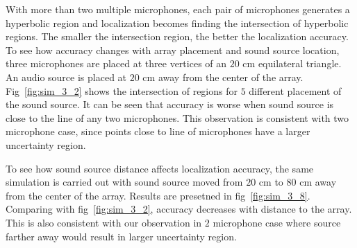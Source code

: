 With more than two multiple microphones, each pair of microphones generates a hyperbolic region and localization becomes finding the intersection of hyperbolic regions. The smaller the intersection region, the better the localization accuracy. To see how accuracy changes with array placement and sound source location, three microphones are placed at three vertices of an $20$ cm equilateral triangle. An audio source is placed at $20$ cm away from the center of the array. Fig~\ref{fig:sim_3_2} shows the intersection of regions for $5$ different placement of the sound source. It can be seen that accuracy is worse when sound source is close to the line of any two microphones. This observation is consistent with two microphone case, since points close to line of microphones have a larger uncertainty region.

To see how sound source distance affects localization accuracy, the same simulation is carried out with sound source moved from $20$ cm to $80$ cm away from the center of the array. Results are presetned in fig~\ref{fig:sim_3_8}. Comparing with fig~\ref{fig:sim_3_2}, accuracy decreases with distance to the array. This is also consistent with our observation in $2$ microphone case where source farther away would result in larger uncertainty region.

